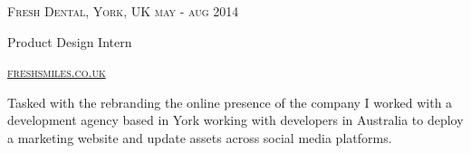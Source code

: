 {
  \textsc{\small{Fresh Dental, York, UK
      \hfill
          {\raggedleft
              may - aug 2014
          } \\
      }
  }
  {\raggedright\large {
    Product Design Intern
  } \\}

  \textsc{\small\href{http://www.freshsmiles.co.uk}{freshsmiles.co.uk}}

  \normalsize{\raggedright
    Tasked with the rebranding the online presence of the company I worked with a development agency based in York working with developers in Australia to deploy a marketing website and update assets across social media platforms. 
  }
}
